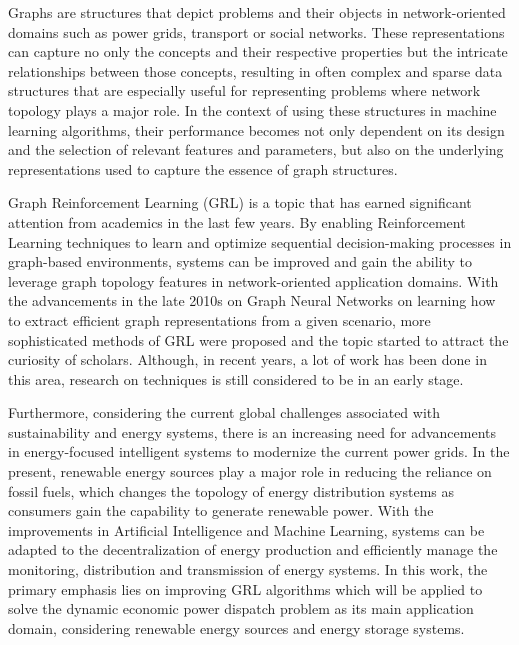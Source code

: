 Graphs are structures that depict problems and their objects in network-oriented domains such as power grids, transport or social networks. These representations can capture no only the concepts and their respective properties but the intricate relationships between those concepts, resulting in often complex and sparse data structures that are especially useful for representing problems where network topology plays a major role. In the context of using these structures in machine learning algorithms, their performance becomes not only dependent on its design and the selection of relevant features and parameters, but also on the underlying representations used to capture the essence of graph structures. \par
Graph Reinforcement Learning (GRL) is a topic that has earned significant attention from academics in the last few years. By enabling Reinforcement Learning techniques to learn and optimize sequential decision-making processes in graph-based environments, systems can be improved and gain the ability to leverage graph topology features in network-oriented application domains. With the advancements in the late 2010s on Graph Neural Networks on learning how to extract efficient graph representations from a given scenario, more sophisticated methods of GRL were proposed and the topic started to attract the curiosity of scholars. Although, in recent years, a lot of work has been done in this area, research on techniques is still considered to be in an early stage. \par
Furthermore, considering the current global challenges associated with sustainability and energy systems, there is an increasing need for advancements in energy-focused intelligent systems to modernize the current power grids. In the present, renewable energy sources play a major role in reducing the reliance on fossil fuels, which changes the topology of energy distribution systems as consumers gain the capability to generate renewable power. With the improvements in Artificial Intelligence and Machine Learning, systems can be adapted to the decentralization of energy production and efficiently manage the monitoring, distribution and transmission of energy systems. In this work, the primary emphasis lies on improving GRL algorithms which will be applied to solve the dynamic economic power dispatch problem as its main application domain, considering renewable energy sources and energy storage systems.  \par

